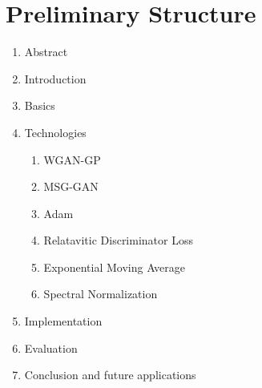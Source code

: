 \documentclass[conference,onecolumn,compsoc]{IEEEtran}
\begin{document}
\noindent
\blindtext


\section{Preliminary  Structure}

\noindent
\begin{enumerate}
  \item Abstract
  \item Introduction
  \item Basics \cite{goodfellow2014generative}
  \item Technologies
  \begin{enumerate}
    \item WGAN-GP \cite{arjovsky2017wasserstein,gulrajani2017improved}
    \item MSG-GAN \cite{karnewar2020msggan}
    \item Adam \cite{kingma2017adam}
    \item Relatavitic Discriminator Loss \cite{jolicoeurmartineau2018relativistic}
    \item Exponential Moving Average \cite{yazıcı2019unusual}
    \item Spectral Normalization \cite{miyato2018spectral}
  \end{enumerate}
  \item Implementation
  \item Evaluation
  \item Conclusion and future applications
\end{enumerate}


\newpage


\printbibliography
\end{document}
